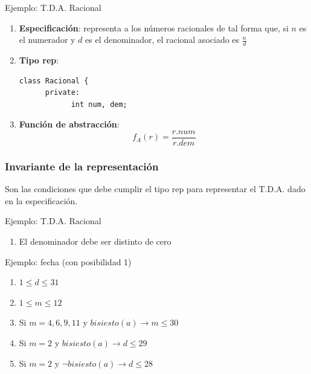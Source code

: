 \documentclass[10pt,a4paper,spanish]{report}
\begin{document}
\noindent
Ejemplo: T.D.A. Racional
\begin{enumerate}[$\spadesuit$]
\item \textbf{\textcolor[rgb]{0.8,0.2,0.2}{Especificación}}: representa a los números racionales de tal forma que, si $n$ es el numerador y $d$ es el denominador, el racional asociado es $\frac{n}{d}$
\item \textbf{\textcolor[rgb]{0.8,0.2,0.2}{Tipo rep}}:
\begin{verbatim}
class Racional {
      private:
            int num, dem;
\end{verbatim}
\item \textbf{\textcolor[rgb]{0.8,0.2,0.2}{Función de abstracción}}: \begin{displaymath} f_{A}(r) = \frac{r.num}{r.dem} \end{displaymath}
\end{enumerate}

\subsubsection{\textcolor[rgb]{0.8,0.2,0.2}Invariante de la representación}
\noindent
Son las condiciones que debe cumplir el tipo rep para representar el T.D.A. dado en la especificación.

\noindent
Ejemplo: T.D.A. Racional
\begin{enumerate}[$\spadesuit$]
\item El denominador debe ser distinto de cero
\end{enumerate}

\noindent
Ejemplo: fecha (con posibilidad 1)
\begin{enumerate}[$\spadesuit$]
\item $1 \leq d \leq 31$
\item $1 \leq m \leq 12$
\item Si $m=4, 6 ,9, 11$ y $bisiesto(a) \rightarrow m \leq 30$
\item Si $m=2$ y $bisiesto(a) \rightarrow d \leq 29$
\item Si $m=2$ y $\neg bisiesto(a) \rightarrow d \leq 28$
\end{enumerate}
\end{document}
